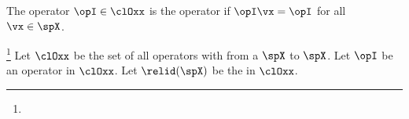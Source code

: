 The operator $\opI\in\clOxx$ is the  operator if $\opI\vx=\opI$ for all $\vx\in\spX$.
\begin{definition}
\footnote{
  }
\label{def:opI}
\label{def:op_inv}
Let $\clOxx$ be the set of all operators with from a  $\spX$ to $\spX$.
Let $\opI$ be an operator in $\clOxx$.
Let $\relid(\spX)$ be the  in $\clOxx$.
\end{definition}




%



